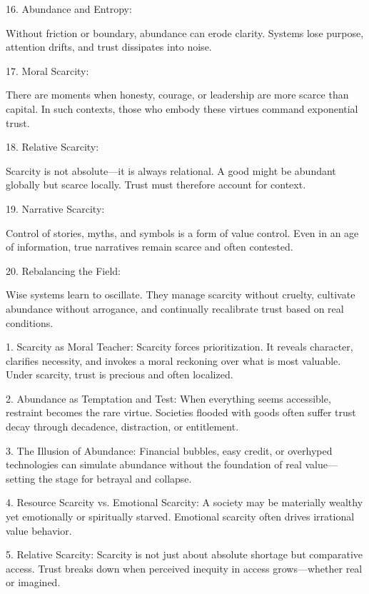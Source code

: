 \documentclass[11pt,oneside]{book}
\begin{document}
16. Abundance and Entropy:

Without friction or boundary, abundance can erode clarity. Systems lose purpose, attention drifts, and trust dissipates into noise.


17. Moral Scarcity:

There are moments when honesty, courage, or leadership are more scarce than capital. In such contexts, those who embody these virtues command exponential trust.


18. Relative Scarcity:

Scarcity is not absolute—it is always relational. A good might be abundant globally but scarce locally. Trust must therefore account for context.


19. Narrative Scarcity:

Control of stories, myths, and symbols is a form of value control. Even in an age of information, true narratives remain scarce and often contested.


20. Rebalancing the Field:

Wise systems learn to oscillate. They manage scarcity without cruelty, cultivate abundance without arrogance, and continually recalibrate trust based on real conditions.


1. Scarcity as Moral Teacher: Scarcity forces prioritization. It reveals character, clarifies necessity, and invokes a moral reckoning over what is most valuable. Under scarcity, trust is precious and often localized.



2. Abundance as Temptation and Test: When everything seems accessible, restraint becomes the rare virtue. Societies flooded with goods often suffer trust decay through decadence, distraction, or entitlement.



3. The Illusion of Abundance: Financial bubbles, easy credit, or overhyped technologies can simulate abundance without the foundation of real value—setting the stage for betrayal and collapse.



4. Resource Scarcity vs. Emotional Scarcity: A society may be materially wealthy yet emotionally or spiritually starved. Emotional scarcity often drives irrational value behavior.



5. Relative Scarcity: Scarcity is not just about absolute shortage but comparative access. Trust breaks down when perceived inequity in access grows—whether real or imagined.
\end{document}
